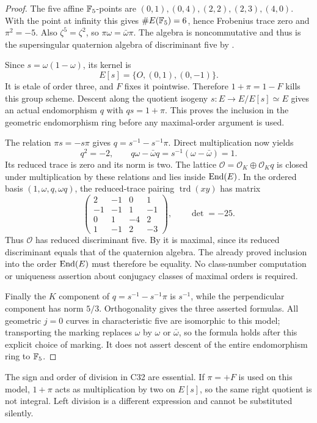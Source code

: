 \begin{proof}
The five affine $\mathbb F_5$-points are $(0,1),(0,4),(2,2),(2,3),(4,0)$. With the point at infinity this gives $\#E(\mathbb F_5)=6$, hence Frobenius trace zero and $\pi^2=-5$. Also $\zeta^5=\zeta^2$, so $\pi\omega=\bar\omega\pi$. The algebra is noncommutative and thus is the supersingular quaternion algebra of discriminant five by \cite[II, Theorem 6.9]{MilneEC}.

Since $s=\omega(1-\omega)$, its kernel is
\[
E[s]=\{O,(0,1),(0,-1)\}.
\]
It is etale of order three, and $F$ fixes it pointwise. Therefore $1+\pi=1-F$ kills this group scheme. Descent along the quotient isogeny $s:E\to E/E[s]\simeq E$ gives an actual endomorphism $q$ with $qs=1+\pi$. This proves the inclusion in the geometric endomorphism ring before any maximal-order argument is used.

The relation $\pi s=-s\pi$ gives $q=s^{-1}-s^{-1}\pi$. Direct multiplication now yields
\[
q^2=-2,\qquad q\omega-\bar\omega q=s^{-1}(\omega-\bar\omega)=1.
\]
Its reduced trace is zero and its norm is two. The lattice $\mathcal O=\mathcal O_K\oplus\mathcal O_Kq$ is closed under multiplication by these relations and lies inside $\operatorname{End}(E)$. In the ordered basis $(1,\omega,q,\omega q)$, the reduced-trace pairing $\operatorname{trd}(xy)$ has matrix
\[
\begin{pmatrix}
2&-1&0&1\\
-1&-1&1&-1\\
0&1&-4&2\\
1&-1&2&-3
\end{pmatrix},
\qquad \det=-25.
\]
Thus $\mathcal O$ has reduced discriminant five. By \cite[Theorem 15.5.5, p.~241]{Voight} it is maximal, since its reduced discriminant equals that of the quaternion algebra. The already proved inclusion into the order $\operatorname{End}(E)$ must therefore be equality. No class-number computation or uniqueness assertion about conjugacy classes of maximal orders is required.

Finally the $K$ component of $q=s^{-1}-s^{-1}\pi$ is $s^{-1}$, while the perpendicular component has norm $5/3$. Orthogonality gives the three asserted formulas. All geometric $j=0$ curves in characteristic five are isomorphic to this model; transporting the marking replaces $\omega$ by $\omega$ or $\bar\omega$, so the formula holds after this explicit choice of marking. It does not assert descent of the entire endomorphism ring to $\mathbb F_5$.
\end{proof}

The sign and order of division in C32 are essential. If $\pi=+F$ is used on this model, $1+\pi$ acts as multiplication by two on $E[s]$, so the same right quotient is not integral. Left division is a different expression and cannot be substituted silently.

